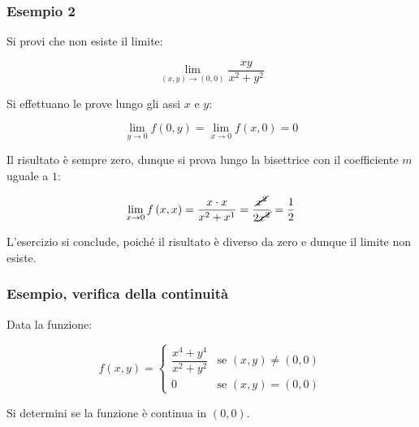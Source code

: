 \documentclass[a4paper]{article}
\begin{document}
	\newpage
	
	\subsubsection[Esempio 2]{\textcolor{Green4}{Esempio 2}}
	
	Si provi che non esiste il limite:
	
	\begin{equation*}
		\lim_{\left(x,y\right) \rightarrow \left(0,0\right)} \dfrac{xy}{x^{2} + y^{2}}
	\end{equation*}

	\noindent
	Si effettuano le prove lungo gli assi $x$ e $y$:
	
	\begin{equation*}
		\lim_{y \rightarrow 0}f\left(0,y\right) = \lim_{x \rightarrow 0} f\left(x,0\right) = 0
	\end{equation*}

	\noindent
	Il risultato è sempre zero, dunque si prova lungo la bisettrice con il coefficiente $m$ uguale a $1$:
	
	\begin{equation*}
		\lim_{x \rightarrow 0} f\left(x,x\right) = \dfrac{x \cdot x}{x^{2} + x^{1}} = \dfrac{\cancel{x^{2}}}{2 \cancel{x^{2}}} = \dfrac{1}{2}
	\end{equation*}

	\noindent
	L'esercizio si conclude, poiché il risultato è diverso da zero e dunque il limite non esiste.
	
	\newpage
	
	\subsubsection[Esempio, verifica della continuità]{\textcolor{Green4}{Esempio, verifica della continuità}}
	
	Data la funzione:
	
	\begin{equation*}
		f\left(x,y\right) =
		\begin{cases}
			\dfrac{x^{4} + y^{4}}{x^{2} + y^{2}}	& \text{se } \left(x,y\right) \ne \left(0,0\right) \\
			0										& \text{se }\left(x,y\right) = \left(0,0\right)
		\end{cases}
	\end{equation*}

	\noindent
	Si determini se la funzione è continua in $\left(0,0\right)$.\newline
	
\end{document}
